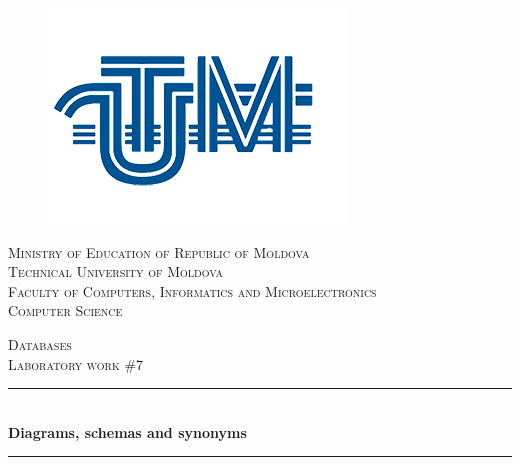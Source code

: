 \begin{titlepage}

  \begin{center} %

\begin{figure}[!h]
	\centering
	\includegraphics[scale=0.35]{logo.png}
\end{figure}

  
  \textsc{\large Ministry of Education of Republic of Moldova}\\[0.5cm]
  \textsc{\large Technical University of Moldova}\\[0.5cm]
  \textsc{\large Faculty of Computers, Informatics and Microelectronics}\\[0.5cm]
  \textsc{\large Computer Science}\\[0.5cm]
  \vspace{20 mm}

  \textsc{\Large Databases}\\[0.5cm] %
  \textsc{\large Laboratory work \#7}\\[0.5cm] %

\newcommand{\HRule}{\rule{\linewidth}{0.5mm}} %

  \vspace{5 mm}
  \HRule \\[0.4cm]
  { \LARGE \bfseries Diagrams, schemas and synonyms}\\[0.4cm] %
  \HRule \\[1.5cm]


\end{center}
\end{titlepage}
